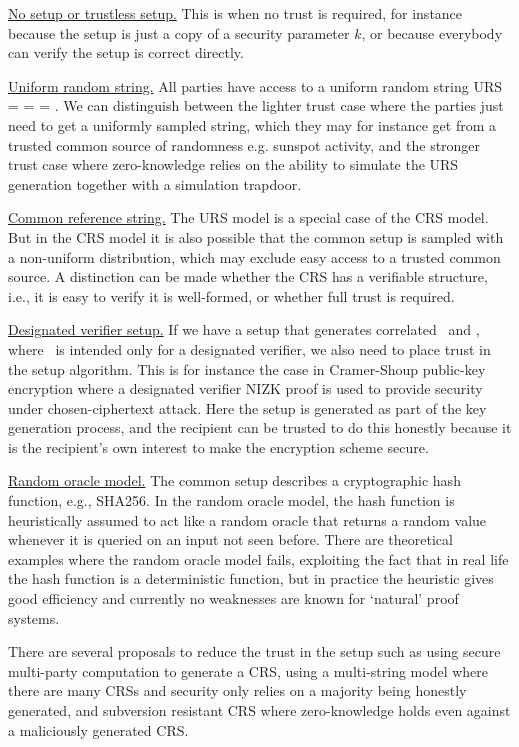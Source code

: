 \begin{bulletize}
	\item \underline{No setup or trustless setup.}
	This is when no trust is required, for instance because the setup is just a copy of a security parameter $k$, or because everybody can verify the setup is correct directly.
    
	\item \underline{Uniform random string.}
	All parties have access to a uniform random string URS = \setR = \setP = \setV. 
	We can distinguish between the lighter trust case where the parties just need to get a uniformly sampled string, which they may for instance get from a trusted common source of randomness e.g. sunspot activity, and the stronger trust case where zero-knowledge relies on the ability to simulate the URS generation together with a simulation trapdoor.

  \item \underline{Common reference string.}
	The URS model is a special case of the CRS model. 
	But in the CRS model it is also possible that the common setup is sampled with a non-uniform distribution, which may exclude easy access to a trusted common source. 
	A distinction can be made whether the CRS has a verifiable structure, i.e., it is easy to verify it is well-formed, or whether full trust is required.
    
	\item \underline{Designated verifier setup.}
	If we have a setup that generates correlated \setP\ and \setV, where \setV\ is intended only for a designated verifier, we also need to place trust in the setup algorithm. 
	This is for instance the case in Cramer-Shoup public-key encryption where a designated verifier NIZK proof is used to provide security under chosen-ciphertext attack. 
	Here the setup is generated as part of the key generation process, and the recipient can be trusted to do this honestly because it is the recipient’s own interest to make the encryption scheme secure.
    
	\item \underline{Random oracle model.}
	The common setup describes a cryptographic hash function, e.g., SHA256. 
	In the random oracle model, the hash function is heuristically assumed to act like a random oracle that returns a random value whenever it is queried on an input not seen before. 
	There are theoretical examples where the random oracle model fails, exploiting the fact that in real life the hash function is a deterministic function, but in practice the heuristic gives good efficiency and currently no weaknesses are known for ‘natural’ proof systems.
    
	\item There are several proposals to reduce the trust in the setup such as using secure multi-party computation to generate a CRS, using a multi-string model where there are many CRSs and security only relies on a majority being honestly generated, and subversion resistant CRS where zero-knowledge holds even against a maliciously generated CRS.
\end{bulletize}

